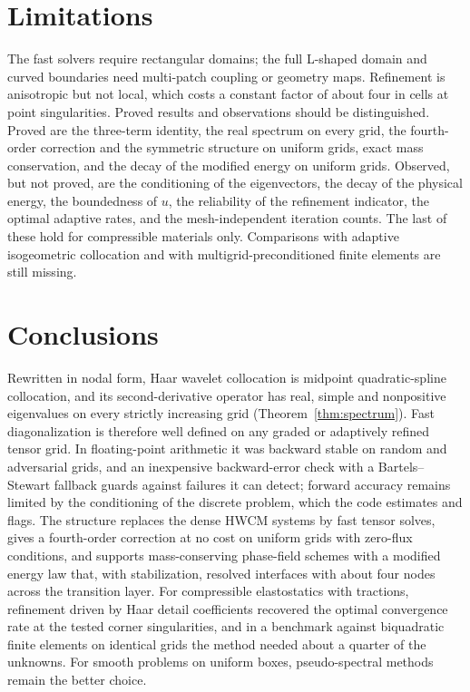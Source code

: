 \documentclass[smallextended,envcountsame]{svjour3}
\begin{document}
\section{Limitations}\label{sec:limits}
The fast solvers require rectangular domains; the full L-shaped domain and curved boundaries need
multi-patch coupling or geometry maps. Refinement is anisotropic but not local, which costs a constant
factor of about four in cells at point singularities. Proved results and observations should be
distinguished. Proved are the three-term identity, the real spectrum on every grid, the fourth-order
correction and the symmetric structure on uniform grids, exact mass conservation, and the decay of the
modified energy on uniform grids. Observed, but not proved, are the conditioning of the eigenvectors, the
decay of the physical energy, the boundedness of $u$, the reliability of the refinement indicator, the
optimal adaptive rates, and the mesh-independent iteration counts. The last of these hold for compressible
materials only. Comparisons with adaptive isogeometric collocation and with multigrid-preconditioned finite
elements are still missing.

\section{Conclusions}
Rewritten in nodal form, Haar wavelet collocation is midpoint quadratic-spline collocation, and its
second-derivative operator has real, simple and nonpositive eigenvalues on every strictly increasing grid
(Theorem~\ref{thm:spectrum}). Fast diagonalization is therefore well defined on any graded or adaptively
refined tensor grid. In floating-point arithmetic it was backward stable on random and adversarial grids,
and an inexpensive backward-error check with a Bartels--Stewart fallback guards against failures it can
detect; forward accuracy remains limited by the conditioning of the discrete problem, which the code
estimates and flags. The structure replaces the dense HWCM systems by fast tensor solves, gives a
fourth-order correction at no cost on uniform grids with zero-flux conditions, and supports
mass-conserving phase-field schemes with a modified energy law that, with stabilization, resolved
interfaces with about four nodes across the transition layer. For compressible elastostatics with
tractions, refinement driven by Haar detail coefficients recovered the optimal convergence rate at the
tested corner singularities, and in a benchmark against biquadratic finite elements on identical grids the
method needed about a quarter of the unknowns. For smooth problems on uniform boxes, pseudo-spectral
methods remain the better choice.
\end{document}
